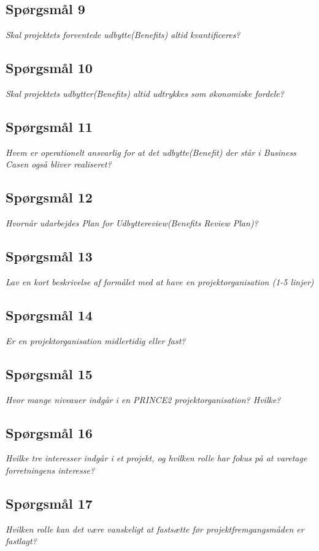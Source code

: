 \documentclass[12pt,twoside]{article}
\begin{document}
    \subsection{Sp\o{}rgsm\r{a}l 9}
    \textit{Skal projektets forventede udbytte(Benefits) altid kvantificeres?}
    \subsection{Sp\o{}rgsm\r{a}l 10}
    \textit{Skal projektets udbytter(Benefits) altid udtrykkes som økonomiske fordele?}
    \subsection{Sp\o{}rgsm\r{a}l 11}
    \textit{Hvem er operationelt ansvarlig for at det udbytte(Benefit) der står i Business Casen også bliver realiseret?}
    \subsection{Sp\o{}rgsm\r{a}l 12}
    \textit{Hvornår udarbejdes Plan for Udbyttereview(Benefits Review Plan)?}
    \subsection{Sp\o{}rgsm\r{a}l 13}
    \textit{Lav en kort beskrivelse af formålet med at have en projektorganisation (1-5 linjer)}
    \subsection{Sp\o{}rgsm\r{a}l 14}
    \textit{Er en projektorganisation midlertidig eller fast?}
    \subsection{Sp\o{}rgsm\r{a}l 15}
    \textit{Hvor mange niveauer indgår i en PRINCE2 projektorganisation? Hvilke?}
    \subsection{Sp\o{}rgsm\r{a}l 16}
    \textit{Hvilke tre interesser indgår i et projekt, og hvilken rolle har fokus på at varetage forretningens interesse?}
    \subsection{Sp\o{}rgsm\r{a}l 17}
    \textit{Hvilken rolle kan det være vanskeligt at fastsætte før projektfremgangsmåden er fastlagt?}
\end{document}
